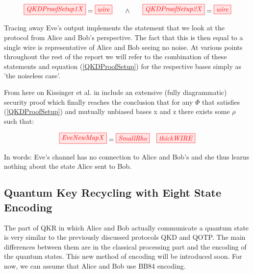 \documentclass[]{article}
\begin{document}
\begin{equation}
	\label{QKDProofSetup}
	\tikzfig{QKDProofSetup1X} = \tikzfig{wire} ~~~~~ \land ~~~~~ \tikzfig{QKDProofSetup2X} = \tikzfig{wire}
\end{equation}

Tracing away Eve's output implements the statement that we look at the protocol from Alice and Bob's perspective. The fact that this is then equal to a single wire is representative of Alice and Bob seeing no noise. At various points throughout the rest of the report we will refer to the combination of these statements and equation (\ref{QKDProofSetup}) for the respective bases simply as 'the noiseless case'.

From here on Kissinger et al. in \cite{Kissinger2017} include an extensive (fully diagrammatic) security proof which finally reaches the conclusion that for any $\Phi$ that satisfies (\ref{QKDProofSetup}) and mutually unbiased bases x and z there exists some $\rho$ such that:

\begin{equation}
\tikzfig{EveNewMapX} = \tikzfig{SmallRho}  ~~~ \tikzfig{thickWIRE}
\end{equation}

In words: Eve's channel has no connection to Alice and Bob's and she thus learns nothing about the state Alice sent to Bob.


\subsection{Quantum Key Recycling with Eight State Encoding}
\label{section:qkr}

The part of QKR in which Alice and Bob actually communicate a quantum state is very similar to the previously discussed protocols QKD and QOTP. The main differences between them are in the classical processing part and the encoding of the quantum states. This new method of encoding will be introduced soon. For now, we can assume that Alice and Bob use BB84 encoding. 
\end{document}
